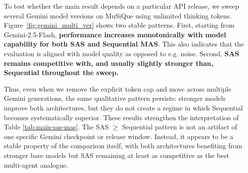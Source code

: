 \documentclass{article} %
\begin{document}


To test whether the main result depends on a particular API release, we sweep several Gemini model versions on MuSiQue using unlimited thinking tokens. Figure~\ref{fig:gemini_multi_ver} shows two stable patterns. First, starting from Gemini-2.5-Flash, \textbf{performance increases monotonically with model capability for both SAS and Sequential MAS}. This also indicates that the evaluation is aligned with model quality as opposed to e.g. noise. Second, \textbf{SAS remains competitive with, and usually slightly stronger than, Sequential throughout the sweep.}

Thus, even when we remove the explicit token cap and move across multiple Gemini generations, the same qualitative pattern persists: stronger models improve both architectures, but they do not create a regime in which Sequential becomes systematically superior.
These results strengthen the interpretation of Table \ref{tab:main-sas-mas}. The SAS $\ge$ Sequential pattern is not an artifact of one specific Gemini checkpoint or release window. Instead, it appears to be a stable property of the comparison itself, with both architectures benefiting from stronger base models but SAS remaining at least as competitive as the best multi-agent analogue.
\end{document}
